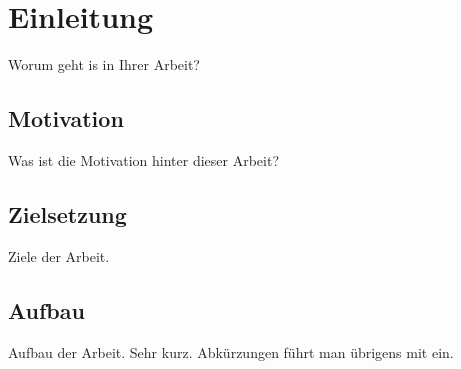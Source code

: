 \chapter{Einleitung}
\label{chap:einleitung}
Worum geht is in Ihrer Arbeit?

\section{Motivation}
\label{sec:motivation}
Was ist die Motivation hinter dieser Arbeit?

\section{Zielsetzung}
\label{sec:zielsetzung}
Ziele der Arbeit.

\section{Aufbau}
\label{sec:aufbau}
Aufbau der Arbeit. Sehr kurz. Abkürzungen führt man übrigens mit  ein.

